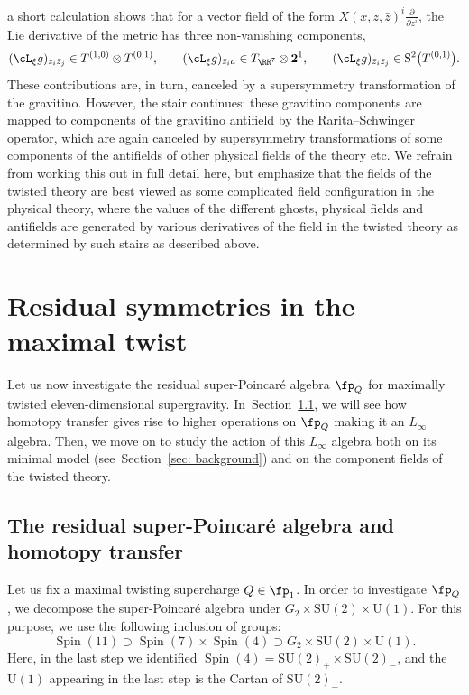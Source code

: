 \documentclass[pdftex]{sigma}
\numberwithin{equation}{section}
\theoremstyle{definition}
\DeclareMathOperator{\Spin}{Spin}
\def\U{\ensuremath{\mathrm{U}}}
\def\SU{\ensuremath{\mathrm{SU}}}
\begin{document}
a short calculation shows that for a vector field of the form $X(x,z,\bar{z})^i \frac{\partial}{\partial z^i}$, the Lie derivative of the metric has three non-vanishing components,
\[
 (\cL_\xi g)_{z_i \bar{z}_j} \in T^{(1,0)} \otimes T^{(0,1)} ,\qquad (\cL_\xi g)_{\bar{z}_i a} \in T_{\RR^7} \otimes \textbf{2}^1, \qquad (\cL_\xi g)_{\bar{z}_i \bar{z}_j} \in \mathrm{S}^2\big(T^{(0,1)}\big).
\]
These contributions are, in turn, canceled by a supersymmetry transformation of the gravitino. However, the stair continues: these gravitino components are mapped to components of the gravitino antifield by the Rarita--Schwinger operator, which are again canceled by supersymmetry transformations of some components of the antifields of other physical fields of the theory etc. We refrain from working this out in full detail here, but emphasize that the fields of the twisted theory are best viewed as some complicated field configuration in the physical theory, where the values of the different ghosts, physical fields and antifields are generated by various derivatives of the field in the twisted theory as determined by such stairs as described above.

\section{Residual symmetries in the maximal twist} \label{sec: max}

Let us now investigate the residual super-Poincar\'e algebra $\fp_Q$ for maximally twisted eleven-dimensional supergravity. In~Section~\ref{sec: max-ht}, we will see how homotopy transfer gives rise to higher operations on $\fp_Q$ making it an $L_\infty$ algebra. Then, we move on to study the action of this $L_\infty$ algebra both on its minimal model (see~Section~\ref{sec: background}) and on the component fields of the twisted theory.

\subsection{The residual super-Poincar\'e algebra and homotopy transfer} \label{sec: max-ht}
Let us fix a maximal twisting supercharge $Q \in \fp_1$. In order to investigate $\fp_Q$, we decompose the super-Poincar\'e algebra under $G_2 \times \SU(2) \times \U(1)$. For this purpose, we use the following inclusion of groups:
\[
 \Spin(11) \supset \Spin(7) \times \Spin(4) \supset G_2 \times \SU(2) \times \U(1).
\]
Here, in the last step we identified $\Spin(4) = \SU(2)_+ \times \SU(2)_-$, and the $\U(1)$ appearing in the last step is the Cartan of $\SU(2)_-$.
\end{document}
